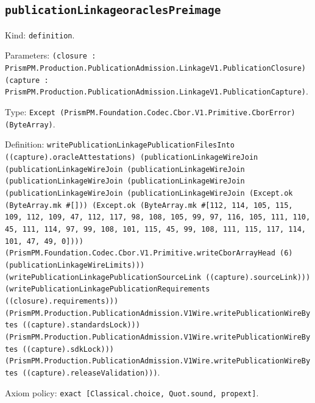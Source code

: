 \documentclass[11pt]{article}
\begin{document}
\subsection*{\texttt{publicationLinkageoraclesPreimage}}
\noindent Kind: \texttt{definition}.\par
\noindent Parameters: \texttt{(closure : PrismPM.Production.PublicationAdmission.LinkageV1.PublicationClosure) (capture : PrismPM.Production.PublicationAdmission.LinkageV1.PublicationCapture)}.\par
\noindent Type: \texttt{Except (PrismPM.Foundation.Codec.Cbor.V1.Primitive.CborError) (ByteArray)}.\par
\noindent Definition: \texttt{writePublicationLinkagePublicationFilesInto ((capture).oracleAttestations) (publicationLinkageWireJoin (publicationLinkageWireJoin (publicationLinkageWireJoin (publicationLinkageWireJoin (publicationLinkageWireJoin (publicationLinkageWireJoin (publicationLinkageWireJoin (Except.ok (ByteArray.mk \#[])) (Except.ok (ByteArray.mk \#[112, 114, 105, 115, 109, 112, 109, 47, 112, 117, 98, 108, 105, 99, 97, 116, 105, 111, 110, 45, 111, 114, 97, 99, 108, 101, 115, 45, 99, 108, 111, 115, 117, 114, 101, 47, 49, 0]))) (PrismPM.Foundation.Codec.Cbor.V1.Primitive.writeCborArrayHead (6) (publicationLinkageWireLimits))) (writePublicationLinkagePublicationSourceLink ((capture).sourceLink))) (writePublicationLinkagePublicationRequirements ((closure).requirements))) (PrismPM.Production.PublicationAdmission.V1Wire.writePublicationWireBytes ((capture).standardsLock))) (PrismPM.Production.PublicationAdmission.V1Wire.writePublicationWireBytes ((capture).sdkLock))) (PrismPM.Production.PublicationAdmission.V1Wire.writePublicationWireBytes ((capture).releaseValidation)))}.\par
\noindent Axiom policy: \texttt{exact [Classical.choice, Quot.sound, propext]}.\par
\end{document}
